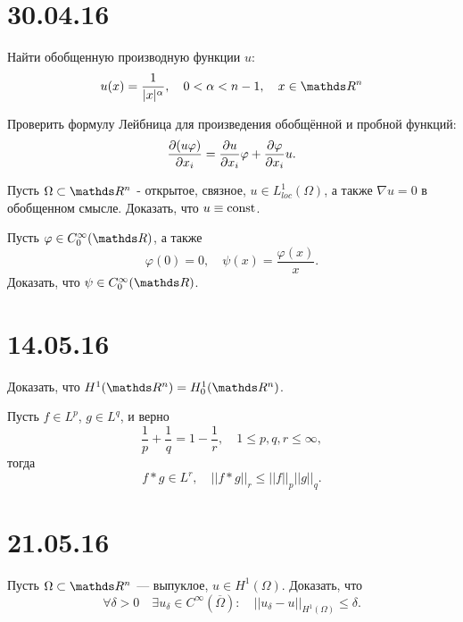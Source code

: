\section*{30.04.16}
\begin{exercise}
Найти обобщенную производную функции $u$:
$$u(x) = \frac {1} {\abs{x}^{\alpha}}, \quad 0 < \alpha < n -1, \quad x \in \real^n$$
\end{exercise}

\begin{exercise}
Проверить формулу Лейбница для произведения обобщённой и пробной функций:
$$\pder[(u \varphi)]{x_i} = \pder[u]{x_i} \varphi + \pder[\varphi]{x_i} u.$$
\end{exercise}

\begin{exercise}
Пусть $\Omega \subset \real^n$ - открытое, связное, $u \in L_{loc}^1(\Omega)$, а также $\nabla u = 0$ в обобщенном смысле. Доказать, что $u \equiv \const$.
\end{exercise}

\begin{exercise} Пусть $\varphi \in C_0^{\infty} (\real)$, а также
$$ \varphi (0) = 0, \quad \psi (x) = \frac {\varphi (x)} {x} .$$
Доказать, что $\psi \in C_0^{\infty} (\real)$.
\end{exercise}

\section*{14.05.16}

\begin{exercise} Доказать, что $H^1 (\real^n) = H_0^1 (\real^n)$.
\end{exercise}

\begin{exercise}
Пусть $f \in L^p$, $g \in L^q$, и верно
$$\frac {1} {p} + \frac {1} {q} = 1 - \frac {1} {r}, \quad 1 \leq p,q,r \leq \infty, $$
тогда
$$f * g \in L^r, \quad || f*g ||_r \leq || f ||_p || g ||_q. $$
\end{exercise}

\section*{21.05.16}
\begin{exercise}
Пусть $\Omega \subset \real^n$ --- выпуклое, $u \in H^1(\Omega)$. Доказать, что
$$\forall \delta > 0 \quad \exists u_{\delta} \in C^{\infty} (\overline{\Omega}):\quad ||u_{\delta} - u ||_{H^1(\Omega)} \leq \delta. $$
\end{exercise}

